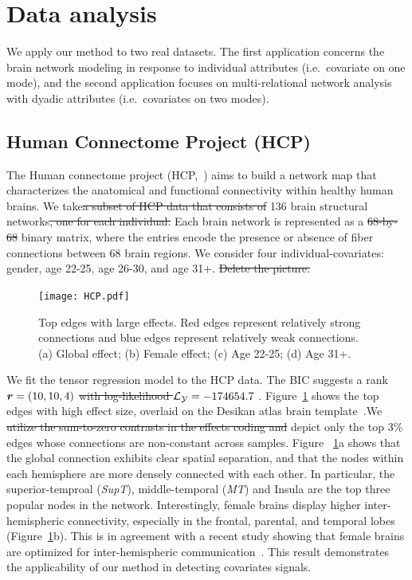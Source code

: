 \documentclass{article}
\theoremstyle{plain}
\theoremstyle{definition}
\providecommand{\DIFaddtex}[1]{{\protect\color{blue}\uwave{#1}}} %
\providecommand{\DIFdeltex}[1]{{\protect\color{red}\sout{#1}}}                      %
\providecommand{\DIFadd}[1]{{\DIFaddtex{#1}}} %
\providecommand{\DIFdel}[1]{{\DIFdeltex{#1}}} %
\begin{document}
\vspace{-.2cm}
\section{Data analysis}
\vspace{-.1cm}
We apply our method to two real datasets. The first application concerns the brain network modeling in response to individual attributes (i.e.\ covariate on one mode), and the second application focuses on multi-relational network analysis with dyadic attributes (i.e.\ covariates on two modes). 
\vspace{-.2cm}
\subsection{Human Connectome Project (HCP)}
\vspace{-.2cm}
The Human connectome project (HCP,~\citep{HCP}) aims to build a network map  that characterizes the anatomical and functional connectivity within healthy human brains. We take\DIFdel{a subset of HCP data that consists of } 136 \DIFadd{individual's} brain structural networks\DIFdel{, one for each individual.}  Each brain network is represented as a \DIFdel{68-by-68 }binary matrix, where the entries encode the presence or absence of fiber connections between 68 brain regions. We consider four individual-covariates: gender, age 22-25, age 26-30, and age 31$+$. \DIFdel{Delete the picture.}

\begin{figure}[ht]
\centering
\vspace{-.2cm}
\texttt{[image: HCP.pdf]}
\caption{Top edges with large effects. Red edges represent relatively strong connections and blue edges represent relatively weak connections. (a) Global effect; (b) Female effect; (c) Age 22-25; (d) Age 31+.}\label{fig:brain}
\vspace{-.2cm}
\end{figure}

We fit the tensor regression model to the HCP data. The BIC suggests a rank $\bm{r}=(10,10,4)$ \DIFdel{with log-likelihood $\mathcal{L}_{\mathcal{Y}}=-174654.7$} . Figure~\ref{fig:brain} \DIFadd{in supplement} shows the top edges with high effect size, overlaid on the Desikan atlas brain template~\cite{xia2013brainnet}.We  \DIFdel{ utilize the sum-to-zero contrasts in the effects coding and} depict only the top 3\% edges whose connections are non-constant across samples. Figure~ \ref{fig:brain}a  shows that the global connection exhibits clear spatial separation, and that the nodes within each hemisphere are more densely connected with each other. In particular, the superior-temproal (\emph{SupT}), middle-temporal (\emph{MT}) and Insula are the top three popular nodes in the network. Interestingly, female brains display higher inter-hemispheric connectivity, especially in the frontal, parental, and temporal lobes (Figure~\ref{fig:brain}b). This is in agreement with a recent study showing that female brains are optimized for inter-hemispheric communication~\cite{ingalhalikar2014sex}. This result demonstrates the applicability of our method in detecting covariates signals. 
\end{document}
